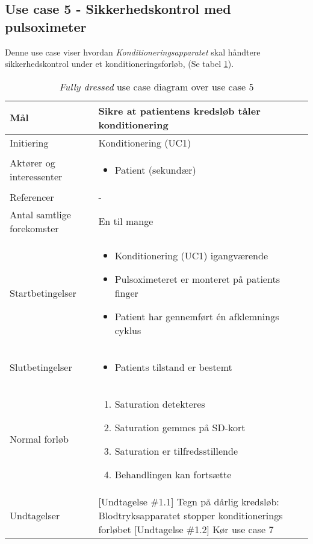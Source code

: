 	\subsection{Use case 5 - Sikkerhedskontrol med pulsoximeter}
	Denne use case viser hvordan \textit{Konditioneringsapparatet} skal håndtere sikkerhedskontrol under et konditioneringsforløb, (Se tabel \ref{tab:uc5}).
	\begin{table}[H]
		\begin{center}
			\begin{tabular}{ | p{} | p{}| } 
				\hline
				Mål & Sikre at patientens kredsløb tåler konditionering \\ 
				\hline
				Initiering &  Konditionering (UC1)\\
				\hline
				Aktører og interessenter & 
				\begin{itemize}
					\item Patient (sekundær)
				\end{itemize} \\ 
				\hline
				Referencer & - \\ 
				\hline
				Antal samtlige forekomster & En til mange \\ 
				\hline	
				Startbetingelser & 
				\begin{itemize}
					\item Konditionering (UC1) igangværende
					\item Pulsoximeteret er monteret på patients finger
					\item Patient har gennemført én afklemnings cyklus
 				\end{itemize} \\ 
				\hline
				Slutbetingelser & 
				\begin{itemize}
					\item Patients tilstand er bestemt 
				\end{itemize} \\ 
				\hline
				Normal forløb & \begin{enumerate}
					\setlength\itemsep{0cm} %
					\item Saturation detekteres
					\item Saturation gemmes på SD-kort
					\item Saturation er tilfredsstillende
					\subitem [Undtagelse \#1.1][Undtagelse \#1.2]
					\item Behandlingen kan fortsætte
				\end{enumerate} \\ 
				\hline
				Undtagelser &  [Undtagelse \#1.1] Tegn på dårlig kredsløb: Blodtryksapparatet stopper konditionerings forløbet 
				[Undtagelse \#1.2] Kør use case 7\\ 
				\hline
			\end{tabular}
		\end{center}
		\caption{\textit{Fully dressed} use case diagram over use case 5} \label{tab:uc5}
	\end{table}
			\newpage
